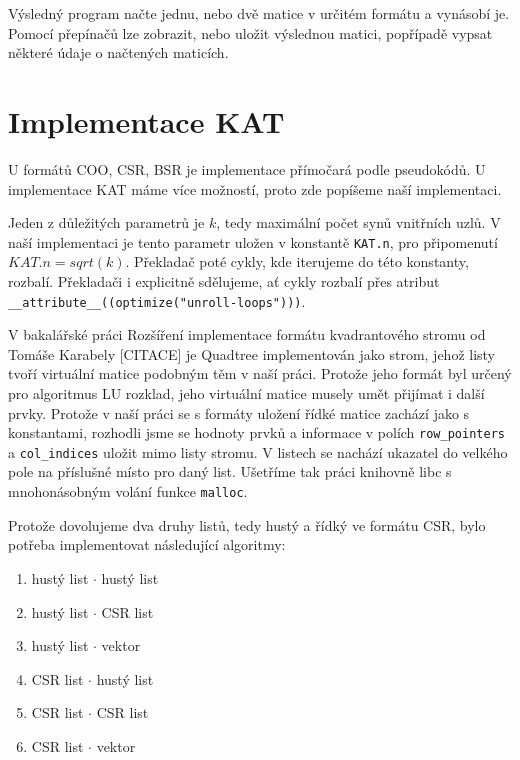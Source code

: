 Výsledný program načte jednu, nebo dvě matice v určitém formátu a vynásobí je. Pomocí přepínačů lze zobrazit, nebo uložit výslednou matici, popřípadě vypsat některé údaje o načtených maticích.


\section{Implementace KAT}

U formátů COO, CSR, BSR je implementace přímočará podle pseudokódů. U implementace KAT máme více možností, proto zde popíšeme naší implementaci.

Jeden z důležitých parametrů je $k$, tedy maximální počet synů vnitřních uzlů. V naší implementaci je tento parametr uložen v konstantě \texttt{KAT.n}, pro připomenutí $KAT.n = sqrt(k)$. Překladač poté cykly, kde iterujeme do této konstanty, rozbalí. Překladači i explicitně sdělujeme, ať cykly rozbalí přes atribut \texttt{\_\_attribute\_\_((optimize("unroll-loops")))}.

V bakalářské práci Rozšíření implementace formátu kvadrantového stromu od Tomáše Karabely [CITACE] je Quadtree implementován jako strom, jehož listy tvoří virtuální matice podobným těm v naší práci. Protože jeho formát byl určený pro algoritmus LU rozklad, jeho virtuální matice musely umět přijímat i další prvky. Protože v naší práci se s formáty uložení řídké matice zachází jako s konstantami, rozhodli jsme se hodnoty prvků a informace v polích \texttt{row\_pointers} a \texttt{col\_indices} uložit mimo listy stromu. V listech se nachází ukazatel do velkého pole na příslušné místo pro daný list. Ušetříme tak práci knihovně libc s mnohonásobným volání funkce \texttt{malloc}.

Protože dovolujeme dva druhy listů, tedy hustý a řídký ve formátu CSR, bylo potřeba implementovat následující algoritmy:

\begin{enumerate}
  \item hustý list $\cdot$ hustý list
  \item hustý list $\cdot$ CSR list
  \item hustý list $\cdot$ vektor
  \item CSR list $\cdot$ hustý list
  \item CSR list $\cdot$ CSR list
  \item CSR list $\cdot$ vektor
\end{enumerate}

